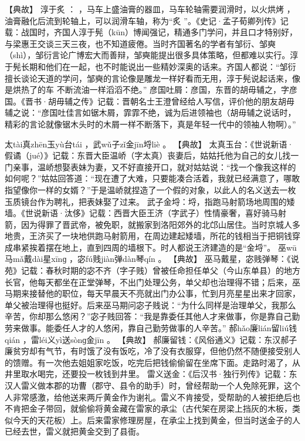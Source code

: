 \documentclass[12pt,UTF8]{ctexbook}
\begin{document}
【典故】
淳于炙
：
，马车上盛油膏的器皿，马车轮轴需要润滑时，以火烘烤
，油膏融化后流到轮轴上，可以润滑车轴，称为“炙
”。《史记·孟子荀卿列传》记载：战国时，齐国人淳于髡（kūn）博闻强记，精通多门学问，并且口才特别好，与梁惠王交谈三天三夜，也不知道疲倦。当时齐国著名的学者有邹衍、邹奭（shì），邹衍言论广博宏大而善辩，邹奭能提出很多具体策略，但都难以实行。淳于髡长期和他们在一起，也不时能说出一些精妙深奥的话来。齐国人都说：“邹衍擅长谈论天道的学问，邹奭的言论像是雕龙一样好看而无用，淳于髡说起话来，像是烘热了的车
不断流油一样滔滔不绝。”
彦国吐屑：彦国，东晋的胡毋辅之，字彦国。《晋书·胡毋辅之传》记载：晋朝名士王澄曾经给人写信，评价他的朋友胡毋辅之说：“彦国吐佳言如锯木屑，霏霏不绝，诚为后进领袖也（胡毋辅之说话时，精彩的言论就像锯木头时的木屑一样不断落下，真是年轻一代中的领袖人物啊）。”

太tài真zhēn玉yù台tái
，武wǔ子zǐ金jīn埒liè
。
【典故】
太真玉台：《世说新语·假谲（jué）》记载：东晋大臣温峤（字太真）丧妻后，姑姑托他为自己的女儿找一门亲事，温峤想娶表妹为妻，又不好直接开口，就对姑姑说：“找一个像我这样的如何呢？”姑姑回答道：“现在遭了大难，只要能凑合活着，我就已经满意了，哪敢指望像你一样的女婿？”于是温峤就捏造了一个假的对象，以此人的名义送去一枚玉质镜台作为聘礼，把表妹娶了过来。
武子金埒：埒，指跑马射箭场地周围的矮墙。《世说新语·汰侈》记载：西晋大臣王济（字武子）性情豪奢，喜好骑马射箭，因为得罪了晋武帝，被免职，就搬家到洛阳郊外的北邙山居住。当时京城人多地贵，王济买了一块地供跑马射箭用，在周边建起矮墙，所花的钱相当于把铜钱穿成串紧挨着摆在地上，直到四周的墙根下。时人都说王济建造的是“金埒”。
巫wū马mǎ戴dài星xīnɡ
，宓fú贱jiàn弹dàn琴qín
。
【典故】
巫马戴星，宓贱弹琴：《说苑》记载：春秋时期的宓不齐（字子贱）曾被任命担任单父（今山东单县）的地方长官，他每天都坐在正堂弹琴，不出门处理公务，单父却也治理得不错；后来，巫马期来接替他的职位，每天早晨天不亮就出门办公事，忙到月亮星星出来才回家，单父被治理得也挺好。后来巫马期问宓子贱说：“为什么同样是治理单父，我那么辛苦，你却那么悠闲？”宓子贱回答：“我是靠委任其他人才来做事，你是靠自己勤劳来做事。能委任人才的人悠闲，靠自己勤劳做事的人辛苦。”
郝hǎo廉lián留liú钱qián
，雷léi义yì送sònɡ金jīn
。
【典故】
郝廉留钱：《风俗通义》记载：东汉郝子廉贫穷却有气节，有时饿了没有饭吃，冷了没有衣服穿，但他仍然不随便接受别人的馈赠。有一次他去姐姐家吃饭，吃完后把钱偷偷留在坐席下面。走路时渴了，从井里取水喝完，还要投一枚钱到井里。
雷义送金：《后汉书·独行列传》记载：东汉人雷义做本郡的功曹（郡守、县令的助手）时，曾经帮助一个人免除死罪，这个人非常感激，给他送来两斤黄金作为谢礼。雷义不肯接受，受帮助的人被拒绝后也不肯把金子带回，就偷偷将黄金藏在雷家的承尘（古代架在房梁上挡灰的木板，类似今天的天花板）上。后来雷家修理房屋，在承尘上找到黄金，但当时送金子的人已经去世，雷义就把黄金交到了县衙。
\end{document}
